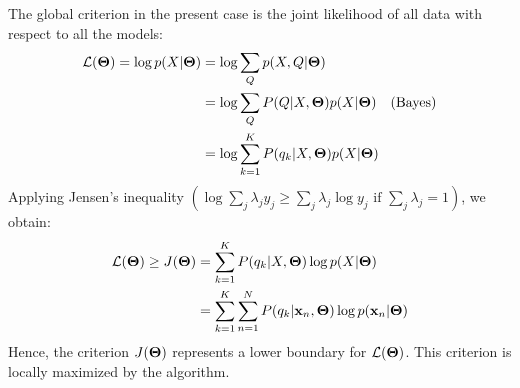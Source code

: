 \documentclass[a4paper]{article}
\newcommand{\xv}{\ensuremath\mathbf{x}}  %
\newcommand{\Tm}{\ensuremath\boldsymbol{\Theta}}  %
\begin{document}
The global criterion in the present case is the joint likelihood of
all data with respect to all the models:
\begin{align*}
{\cal L}(\Tm) = \log p(X|\Tm)
                & = \log \sum_Q p(X,Q|\Tm)\\
                & = \log \sum_Q P(Q|X,\Tm)p(X|\Tm) \quad\text{(Bayes)} \\
                & = \log \sum_{k=1}^{K} P(q_k|X,\Tm) p(X|\Tm)
\end{align*}
Applying Jensen's inequality $\left( \log \sum_j \lambda_j y_j \geq
  \sum_j \lambda_j \log y_j \mbox{ if } \sum_j \lambda_j = 1 \right)$,
we obtain:
\begin{align*}
  {\cal L}(\Tm) \ge J(\Tm)
  &= \sum_{k=1}^{K} P(q_k|X,\Tm) \log p(X|\Tm)\\
  &= \sum_{k=1}^{K} \sum_{n=1}^{N} P(q_k|\xv_n,\Tm) \log p(\xv_n|\Tm)
\end{align*}
Hence, the criterion $J(\Tm)$ represents a lower boundary for ${\cal
  L}(\Tm)$. This criterion is locally maximized by the algorithm.
\end{document}
